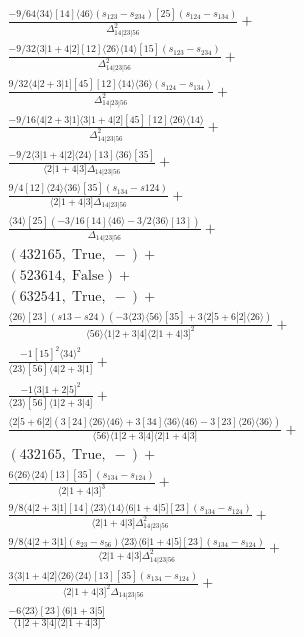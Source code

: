 \documentclass[varwidth, border=5pt]{standalone}
\begin{document}
\begin{my}
$\begin{gathered}
\scriptscriptstyle\frac{-9/64⟨34⟩[14]⟨46⟩\scriptscriptstyle(s_{123}-s_{234})[25](s_{124}-s_{134})}{Δ_{14|23|56}^2}+\\
\scriptscriptstyle\frac{-9/32⟨3|1+4|2][12]⟨26⟩⟨14⟩[15]\scriptscriptstyle(s_{123}-s_{234})}{Δ_{14|23|56}^2}+\\
\scriptscriptstyle\frac{9/32⟨4|2+3|1][45][12]⟨14⟩⟨36⟩\scriptscriptstyle(s_{124}-s_{134})}{Δ_{14|23|56}^2}+\\
\scriptscriptstyle\frac{-9/16⟨4|2+3|1]⟨3|1+4|2][45][12]⟨26⟩⟨14⟩}{Δ_{14|23|56}^2}+\\
\scriptscriptstyle\frac{-9/2⟨3|1+4|2]⟨24⟩[13]⟨36⟩[35]}{⟨2|1+4|3]Δ_{14|23|56}}+\\
\scriptscriptstyle\frac{9/4[12]⟨24⟩⟨36⟩[35]\scriptscriptstyle(s_{134}-s124)}{⟨2|1+4|3]Δ_{14|23|56}}+\\
\scriptscriptstyle\frac{⟨34⟩[25]\scriptscriptstyle(-3/16[14]⟨46⟩-3/2⟨36⟩[13])}{Δ_{14|23|56}}+\\
\scriptscriptstyle(432165,\;\text{True},\;-)+\\
\scriptscriptstyle(523614,\;\text{False})+\\
\scriptscriptstyle(632541,\;\text{True},\;-)+\\
\scriptscriptstyle\frac{⟨26⟩[23]\scriptscriptstyle(s13-s24)(-3⟨23⟩⟨56⟩[35]+3⟨2|5+6|2]⟨26⟩)}{⟨56⟩⟨1|2+3|4]⟨2|1+4|3]^2}+\\
\scriptscriptstyle\frac{-1[15]^2⟨34⟩^2}{⟨23⟩[56]⟨4|2+3|1]}+\\
\scriptscriptstyle\frac{-1⟨3|1+2|5]^2}{⟨23⟩[56]⟨1|2+3|4]}+\\
\scriptscriptstyle\frac{⟨2|5+6|2]\scriptscriptstyle(3[24]⟨26⟩⟨46⟩+3[34]⟨36⟩⟨46⟩-3[23]⟨26⟩⟨36⟩)}{⟨56⟩⟨1|2+3|4]⟨2|1+4|3]}+\\
\scriptscriptstyle(432165,\;\text{True},\;-)+\\
\scriptscriptstyle\frac{6⟨26⟩⟨24⟩[13][35]\scriptscriptstyle(s_{134}-s_{124})}{⟨2|1+4|3]^3}+\\
\scriptscriptstyle\frac{9/8⟨4|2+3|1][14]⟨23⟩⟨14⟩⟨6|1+4|5][23]\scriptscriptstyle(s_{134}-s_{124})}{⟨2|1+4|3]Δ_{14|23|56}^2}+\\
\scriptscriptstyle\frac{9/8⟨4|2+3|1]\scriptscriptstyle(s_{23}-s_{56})⟨23⟩⟨6|1+4|5][23](s_{134}-s_{124})}{⟨2|1+4|3]Δ_{14|23|56}^2}+\\
\scriptscriptstyle\frac{3⟨3|1+4|2]⟨26⟩⟨24⟩[13][35]\scriptscriptstyle(s_{134}-s_{124})}{⟨2|1+4|3]^2Δ_{14|23|56}}+\\
\scriptscriptstyle\frac{-6⟨23⟩[23]⟨6|1+3|5]}{⟨1|2+3|4]⟨2|1+4|3]}\phantom{+}
\end{gathered}$
\end{my}
\end{document}
